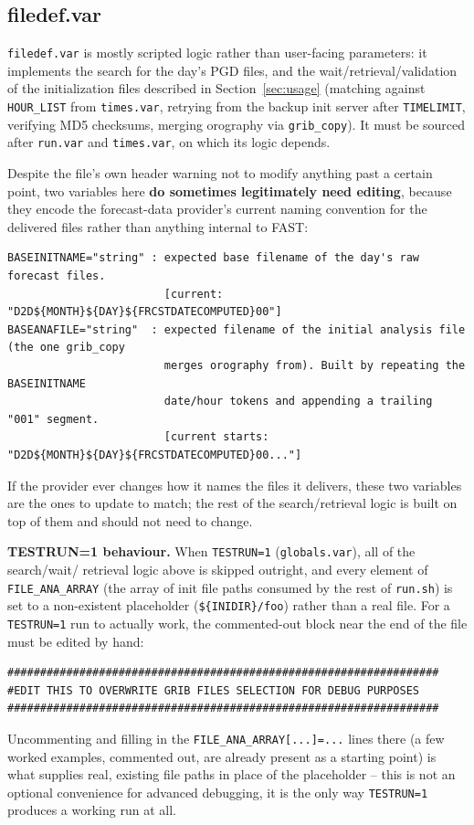 \subsection{filedef.var}
\label{sec:filedef}
\texttt{filedef.var} is mostly scripted logic rather than user-facing parameters: it implements the
search for the day's PGD files, and the wait/retrieval/validation of the initialization files described
in Section~\ref{sec:usage} (matching against \texttt{HOUR\_LIST} from \texttt{times.var}, retrying from
the backup init server after \texttt{TIMELIMIT}, verifying MD5 checksums, merging orography via
\texttt{grib\_copy}). It must be sourced after \texttt{run.var} and \texttt{times.var}, on which its
logic depends.

Despite the file's own header warning not to modify anything past a certain point, two variables here
\textbf{do sometimes legitimately need editing}, because they encode the forecast-data provider's
current naming convention for the delivered files rather than anything internal to FAST:
\begin{lstlisting}
BASEINITNAME="string" : expected base filename of the day's raw forecast files.
                        [current: "D2D${MONTH}${DAY}${FRCSTDATECOMPUTED}00"]
BASEANAFILE="string"  : expected filename of the initial analysis file (the one grib_copy
                        merges orography from). Built by repeating the BASEINITNAME
                        date/hour tokens and appending a trailing "001" segment.
                        [current starts: "D2D${MONTH}${DAY}${FRCSTDATECOMPUTED}00..."]
\end{lstlisting}
If the provider ever changes how it names the files it delivers, these two variables are the ones to
update to match; the rest of the search/retrieval logic is built on top of them and should not need to
change.

\textbf{TESTRUN=1 behaviour.} When \texttt{TESTRUN=1} (\texttt{globals.var}), all of the search/wait/
retrieval logic above is skipped outright, and every element of \texttt{FILE\_ANA\_ARRAY} (the array of
init file paths consumed by the rest of \texttt{run.sh}) is set to a non-existent placeholder
(\texttt{\$\{INIDIR\}/foo}) rather than a real file. For a \texttt{TESTRUN=1} run to actually work, the
commented-out block near the end of the file must be edited by hand:
\begin{lstlisting}
##################################################################
#EDIT THIS TO OVERWRITE GRIB FILES SELECTION FOR DEBUG PURPOSES
##################################################################
\end{lstlisting}
Uncommenting and filling in the \texttt{FILE\_ANA\_ARRAY[...]=...} lines there (a few worked examples,
commented out, are already present as a starting point) is what supplies real, existing file paths in
place of the placeholder -- this is not an optional convenience for advanced debugging, it is the only
way \texttt{TESTRUN=1} produces a working run at all.
